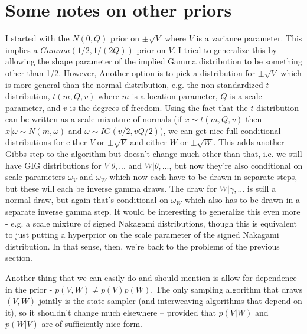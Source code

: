 \documentclass{article}\usepackage[]{graphicx}\usepackage[]{color}
\begin{document}
\section{Some notes on other priors}
I started with the $N(0,Q)$ prior on $\pm\sqrt{V}$ where $V$ is a variance parameter. This implies a $Gamma(1/2,1/(2Q))$ prior on $V$. I tried to generalize this by allowing the shape parameter of the implied Gamma distribution to be something other than 1/2. However, Another option is to pick a distribution for $\pm\sqrt{V}$ which is more general than the normal distribution, e.g. the non-standardized $t$ distribution, $t(m, Q, v)$ where $m$ is a location parameter, $Q$ is a scale parameter, and $v$ is the degrees of freedom. Using the fact that the $t$ distribution can be written as a scale mixuture of normals (if $x\sim t(m,Q,v)$ then $x|\omega \sim N(m,\omega)$ and $\omega\sim IG(v/2, vQ/2)$), we can get nice full conditional distributions for either $V$ or $\pm\sqrt{V}$ and either $W$ or $\pm\sqrt{W}$. This adds another Gibbs step to the algorithm but doesn't change much other than that, i.e. we still have GIG distributions for $V|\theta,...$ and $W|\theta,...$, but now they're also conditional on scale parameters $\omega_V$ and $\omega_W$ which now each have to be drawn in separate steps, but these will each be inverse gamma draws. The draw for $W|\gamma,...$ is still a normal draw, but again that's conditional on $\omega_W$ which also has to be drawn in a separate inverse gamma step. It would be interesting to generalize this even more - e.g. a scale mixture of signed Nakagami distributions, though this is equivalent to just putting a hyperprior on the scale parameter of the signed Nakagami distribution. In that sense, then, we're back to the problems of the previous section.

Another thing that we can easily do and should mention is allow for dependence in the prior - $p(V,W)\neq p(V)p(W)$. The only sampling algorithm that draws $(V,W)$ jointly is the state sampler (and interweaving algorithms that depend on it), so it shouldn't change much elsewhere -- provided that $p(V|W)$ and $p(W|V)$ are of sufficiently nice form.
\end{document}
